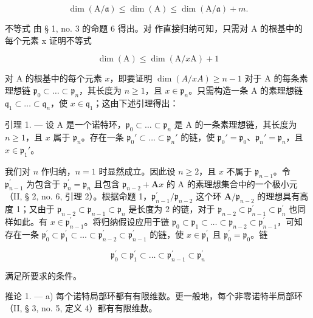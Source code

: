 \[
\dim (\mathrm{A} / \mathfrak {a}) \leqslant \dim (\mathrm{A}) \leqslant \dim (\mathrm{A} / \mathfrak {a}) + m.\tag{4}
\]

不等式  由 § 1, no. 3 的命题 6 得出。对  作直接归纳可知，只需对 A 的根基中的每个元素 x 证明不等式

\[
\dim (\mathrm{A}) \leqslant \dim (\mathrm{A} / x \mathrm{A}) + 1\tag{5}
\]

对 A 的根基中的每个元素 \(x\)，即要证明 \(\dim(A/xA) \geqslant n - 1\) 对于 A 的每条素理想链 \(\mathfrak{p}_0 \subset \ldots \subset \mathfrak{p}_n\)，其长度为 \(n \geqslant 1\)，且 \(x \in \mathfrak{p}_n\)。只需构造一条 A 的素理想链 \(\mathfrak{q}_1 \subset \ldots \subset \mathfrak{q}_n\)，使 \(x \in \mathfrak{q}_1\)；这由下述引理得出：

引理 1. --- 设 A 是一个诺特环，\(\mathfrak{p}_{0} \subset \ldots \subset \mathfrak{p}_{n}\) 是 A 的一条素理想链，其长度为 \(n \geqslant 1\)，且 \(x\) 属于 \(\mathfrak{p}_{n}\)。存在一条 \(\mathfrak{p}_{0}' \subset \ldots \subset \mathfrak{p}_{n}'\) 的链，使 \(\mathfrak{p}_{0}' = \mathfrak{p}_{0}\)、\(\mathfrak{p}_{n}' = \mathfrak{p}_{n}\)，且 \(x \in \mathfrak{p}_{1}'\)。

我们对 \(n\) 作归纳，\(n=1\) 时显然成立。因此设 \(n\geqslant2\)，且 \(x\) 不属于 \(\mathfrak{p}_{n-1}\)。令 \(\mathfrak{p}_{n-1}^{\prime}\) 为包含于 \(\mathfrak{p}_{n}^{\prime}=\mathfrak{p}_{n}\) 且包含 \(\mathfrak{p}_{n-2}+\mathbf{A}x\) 的 A 的素理想集合中的一个极小元（II, § 2, no. 6, 引理 2）。根据命题 1，\(\mathfrak{p}_{n-1}^{\prime}/\mathfrak{p}_{n-2}\) 这个环 \(\mathbf{A}/\mathfrak{p}_{n-2}\) 的理想具有高度 1；又由于 \(\mathfrak{p}_{n-2}\subset\mathfrak{p}_{n-1}\subset\mathfrak{p}_{n}\) 是长度为 2 的链，对于 \(\mathfrak{p}_{n-2}\subset\mathfrak{p}_{n-1}^{\prime}\subset\mathfrak{p}_{n}^{\prime}\) 也同样如此。有 \(x\in\mathfrak{p}_{n-1}^{\prime}\)。将归纳假设应用于链 \(\mathfrak{p}_{0}\subset\mathfrak{p}_{1}\subset\ldots\subset\mathfrak{p}_{n-2}\subset\mathfrak{p}_{n-1}^{\prime}\)，可知存在一条 \(\mathfrak{p}_{0}^{\prime}\subset\mathfrak{p}_{1}^{\prime}\subset\ldots\subset\mathfrak{p}_{n-2}^{\prime}\subset\mathfrak{p}_{n-1}^{\prime}\) 的链，使 \(x\in\mathfrak{p}_{1}^{\prime}\) 且 \(\mathfrak{p}_{0}^{\prime}=\mathfrak{p}_{0}\)。链

\[
\mathfrak {p} _ {0} ^ {\prime} \subset \mathfrak {p} _ {1} ^ {\prime} \subset \dots \subset \mathfrak {p} _ {n - 1} ^ {\prime} \subset \mathfrak {p} _ {n} ^ {\prime}
\]

满足所要求的条件。

推论 1. --- a) 每个诺特局部环都有有限维数。更一般地，每个非零诺特半局部环（II, § 3, no. 5, 定义 4）都有有限维数。

